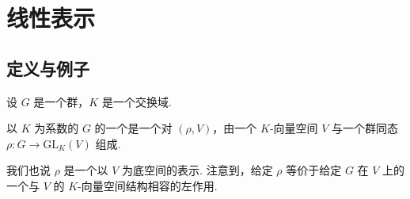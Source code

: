 \chapter{线性表示}\label{chap:fg-4}
\section{定义与例子}\label{sec:fg-4-1}

设 $G$ 是一个群，$K$ 是一个交换域.

\begin{definition}\label{def:fg-4-1-1}
以 $K$ 为系数的 $G$ 的一个是一个对 $(\rho,V)$，由一个 $K$-向量空间 $V$ 与一个群同态 $\rho:G\longrightarrow\mathrm{GL}_K(V)$ 组成.
\end{definition}

我们也说 $\rho$ 是一个以 $V$ 为底空间的表示. 注意到，给定 $\rho$ 等价于给定 $G$ 在 $V$ 上的一个与 $V$ 的 $K$-向量空间结构相容的左作用.


